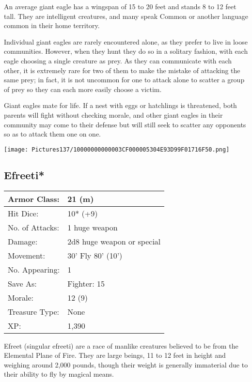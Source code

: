 \documentclass[a4paper,twoside,openany,10pt]{book}
\begin{document}
\begin{multicols}{2}
An average giant eagle has a wingspan of 15 to 20 feet and stands 8 to 12 feet tall. They are intelligent creatures, and many speak Common or another language common in their home territory.

Individual giant eagles are rarely encountered alone, as they prefer to live in loose communities. However, when they hunt they do so in a solitary fashion, with each eagle choosing a single creature as prey. As they can communicate with each other, it is extremely rare for two of them to make the mistake of attacking the same prey; in fact, it is not uncommon for one to attack alone to scatter a group of prey so they can each more easily choose a victim.

Giant eagles mate for life. If a nest with eggs or hatchlings is threatened, both parents will fight without checking morale, and other giant eagles in their community may come to their defense but will still seek to scatter any opponents so as to attack them one on one.

\begin{center}
	\texttt{[image: Pictures137/10000000000003CF000005304E93D99F01716F50.png]}
\end{center}

\subsection*{Efreeti*}\label{efreeti}

\begin{tabularx}{0.48\textwidth}{@{}lX@{}}
Armor Class: & 21 (m) \\\hline
Hit Dice: & 10* (+9) \\\hline
No. of Attacks: & 1 huge weapon \\\hline
Damage: & 2d8 huge weapon or special \\\hline
Movement: & 30' Fly 80'
(10') \\\hline
No. Appearing: & 1 \\\hline
Save As: & Fighter: 15 \\\hline
Morale: & 12 (9) \\\hline
Treasure Type: & None \\\hline
XP: & 1,390 \\\hline
\end{tabularx}\medskip

Efreet (singular efreeti) are a race of manlike creatures believed to be from the Elemental Plane of Fire. They are large beings, 11 to 12 feet in height and weighing around 2,000 pounds, though their weight is generally immaterial due to their ability to fly by magical means.


\end{multicols}
\end{document}
